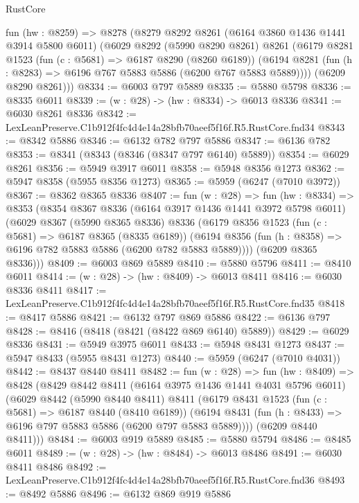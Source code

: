 \begin{lexlean}{RustCore}
\begin{coremodule}
  fun (hw : @8259) =>
  @8278
    (@8279
      @8292
      @8261
      (@6164 @3860 @1436 @1441 @3914 @5800 @6011)
      (@6029
        @8292
        (@5990 @8290 @8261)
        @8261
        (@6179
          @8281
          @1523
          (fun (c : @5681) => @6187 @8290 (@8260 @6189))
          (@6194 @8281 (fun (h : @8283) => @6196 @767 @5883 @5886 (@6200 @767 @5883 @5889))))
        (@6209 @8290 @8261)))
@8334 := @6003 @797 @5889
@8335 := @5880 @5798
@8336 := @8335 @6011
@8339 := (w : @28) -> (hw : @8334) -> @6013 @8336
@8341 := @6030 @8261 @8336
@8342 := LexLeanPreserve.C1b912f4fc4d4e14a28bfb70aeef5f16f.R5.RustCore.fnd34
@8343 := @8342 @5886
@8346 := @6132 @782 @797 @5886
@8347 := @6136 @782
@8353 := @8341 (@8343 (@8346 (@8347 @797 @6140) @5889))
@8354 := @6029 @8261
@8356 := @5949 @3917 @6011
@8358 := @5948 @8356 @1273
@8362 := @5947 @8358 (@5955 @8356 @1273)
@8365 := @5959 (@6247 (@7010 @3972))
@8367 := @8362 @8365 @8336
@8407 := fun (w : @28) =>
  fun (hw : @8334) =>
  @8353
    (@8354
      @8367
      @8336
      (@6164 @3917 @1436 @1441 @3972 @5798 @6011)
      (@6029
        @8367
        (@5990 @8365 @8336)
        @8336
        (@6179
          @8356
          @1523
          (fun (c : @5681) => @6187 @8365 (@8335 @6189))
          (@6194 @8356 (fun (h : @8358) => @6196 @782 @5883 @5886 (@6200 @782 @5883 @5889))))
        (@6209 @8365 @8336)))
@8409 := @6003 @869 @5889
@8410 := @5880 @5796
@8411 := @8410 @6011
@8414 := (w : @28) -> (hw : @8409) -> @6013 @8411
@8416 := @6030 @8336 @8411
@8417 := LexLeanPreserve.C1b912f4fc4d4e14a28bfb70aeef5f16f.R5.RustCore.fnd35
@8418 := @8417 @5886
@8421 := @6132 @797 @869 @5886
@8422 := @6136 @797
@8428 := @8416 (@8418 (@8421 (@8422 @869 @6140) @5889))
@8429 := @6029 @8336
@8431 := @5949 @3975 @6011
@8433 := @5948 @8431 @1273
@8437 := @5947 @8433 (@5955 @8431 @1273)
@8440 := @5959 (@6247 (@7010 @4031))
@8442 := @8437 @8440 @8411
@8482 := fun (w : @28) =>
  fun (hw : @8409) =>
  @8428
    (@8429
      @8442
      @8411
      (@6164 @3975 @1436 @1441 @4031 @5796 @6011)
      (@6029
        @8442
        (@5990 @8440 @8411)
        @8411
        (@6179
          @8431
          @1523
          (fun (c : @5681) => @6187 @8440 (@8410 @6189))
          (@6194 @8431 (fun (h : @8433) => @6196 @797 @5883 @5886 (@6200 @797 @5883 @5889))))
        (@6209 @8440 @8411)))
@8484 := @6003 @919 @5889
@8485 := @5880 @5794
@8486 := @8485 @6011
@8489 := (w : @28) -> (hw : @8484) -> @6013 @8486
@8491 := @6030 @8411 @8486
@8492 := LexLeanPreserve.C1b912f4fc4d4e14a28bfb70aeef5f16f.R5.RustCore.fnd36
@8493 := @8492 @5886
@8496 := @6132 @869 @919 @5886

\end{coremodule}
\end{lexlean}
